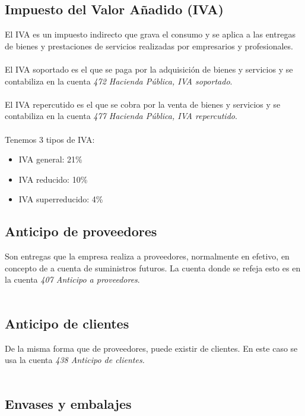 \documentclass[a4paper,12pt]{article}
\begin{document}
\subsection{Impuesto del Valor Añadido (IVA)}

El IVA es un impuesto indirecto que grava el consumo y se aplica a las entregas de bienes y prestaciones de servicios realizadas por empresarios y profesionales.\\\\
El IVA soportado es el que se paga por la adquisición de bienes y servicios y se contabiliza en la cuenta \textit{472 Hacienda Pública, IVA soportado}.\\\\
El IVA repercutido es el que se cobra por la venta de bienes y servicios y se contabiliza en la cuenta \textit{477 Hacienda Pública, IVA repercutido}.\\\\
Tenemos 3 tipos de IVA:
\begin{itemize}
    \item IVA general: 21\%
    \item IVA reducido: 10\%
    \item IVA superreducido: 4\%
\end{itemize}

\subsection{Anticipo de proveedores}

Son entregas que la empresa realiza a proveedores, normalmente en efetivo, en concepto de a cuenta de suministros futuros. La cuenta donde se refeja esto es en la cuenta \textit{407 Anticipo a proveedores}.\\\\

\subsection{Anticipo de clientes}

De la misma forma que de proveedores, puede existir de clientes. En este caso se usa la cuenta \textit{438 Anticipo de clientes.}\\\\

\subsection{Envases y embalajes}
\end{document}
